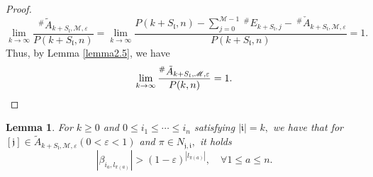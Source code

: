 \documentclass[11pt]{article}
\theoremstyle{plain}
\newtheorem{lem}[thm]{Lemma}
\theoremstyle{definition}
\begin{document}
\begin{proof}
	$$
\lim\limits_{k\to \infty}\frac{^{\#  } \tilde{A}_{k+S_{\mathfrak{l}},\mathscr{M},\varepsilon }  }{P(k+S_{\mathfrak{l}},n) }=\lim\limits_{k\to \infty}\frac{P(k+S_{\mathfrak{l}},n) - \sum\limits_{j=0}^{\mathscr{M}-1} \ ^{\#  } E_{k+S_{\mathfrak{l}},j}   - \ ^{\#  } \check{A}_{k+S_{\mathfrak{l}},\mathscr{M},\varepsilon }  }{P(k+S_{\mathfrak{l}},n) } = 1.
$$
	Thus, by Lemma \ref{lemma2.5}, we have
		\begin{equation*}
			\lim\limits_{k\to \infty}\frac{^{\#  } \tilde{A}_{k+S_{\mathfrak{l}},\mathscr{M},\varepsilon }  }{P(k,n) }= 1. \qedhere
		\end{equation*}
\end{proof}
\begin{lem}\label{lem248}
For $k \geq 0$ and $0 \leq i_1 \leq \cdots \leq i_n$ satisfying $|\mathfrak{i}|=k,$ we have that for $[\mathfrak{j}] \in \tilde{A}_{k+S_{\mathfrak{l}},\mathscr{M},\varepsilon }(0 < \varepsilon < 1)$ 
 and $\pi \in N_{\mathfrak{j}, \mathfrak{i}  },$
it holds
\begin{equation*}\label{eq25111} \left | \beta_{i_{a},l_{\pi  (a)}} \right | >\left ( 1 - \varepsilon \right ) ^{ \left | l_{\pi(a)} \right |   },\quad \forall 1 \le a \le n.\end{equation*}
\end{lem}
\end{document}
